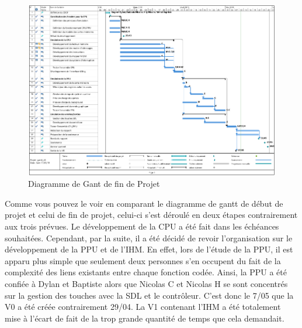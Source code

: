 \begin{figure}[h]
  \centering
   \includegraphics[scale=0.45]{GantV2.png}
   \caption{\label{étiquette} Diagramme de Gant de fin de Projet}
\end{figure}

Comme vous pouvez le voir en comparant le diagramme de gantt de début de projet et celui de fin de projet, celui-ci s'est déroulé en deux étapes contrairement aux trois prévues. Le développement de la CPU a été fait dans les échéances souhaitées. Cependant, par la suite, il a été décidé de revoir l'organisation sur le développement de la PPU et de l'IHM. En effet, lors de l'étude de la PPU, il est apparu plus simple que seulement deux personnes s'en occupent du fait de la complexité des liens existants entre chaque fonction codée. Ainsi, la PPU a été confiée à Dylan et Baptiste alors que Nicolas C et Nicolas H se sont concentrés sur la gestion des touches avec la SDL et le contrôleur. C'est donc le 7/05 que la V0 a été créée contrairement 29/04. La V1 contenant l'IHM a été totalement mise à l'écart de fait de la trop grande quantité de temps que cela demandait.
